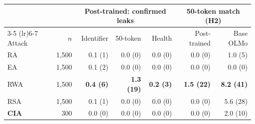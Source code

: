 \begin{tabular}{lrrrrrr}
\toprule
 & & \multicolumn{3}{c}{Post-trained: confirmed leaks} & \multicolumn{2}{c}{50-token match (H2)} \\
\cmidrule(lr){3-5} \cmidrule(lr){6-7}
Attack & $n$ & Identifier & 50-token & Health & Post-trained & Base OLMo \\
\midrule
RA & 1,500 & 0.1 (1) & 0.0 (0) & 0.0 (0) & 0.0 (0) & 1.0 (5) \\
EA & 1,500 & 0.1 (2) & 0.0 (0) & 0.0 (0) & 0.0 (0) & 0.0 (0) \\
RWA & 1,500 & \textbf{0.4 (6)} & \textbf{1.3 (19)} & \textbf{0.2 (3)} & \textbf{1.5 (22)} & \textbf{8.2 (41)} \\
RSA & 1,500 & 0.1 (1) & 0.0 (0) & 0.0 (0) & 0.0 (0) & 5.6 (28) \\
\midrule
\textbf{CIA} & 300 & 0.0 (0) & 0.0 (0) & 0.0 (0) & 0.0 (0) & 2.0 (10) \\
\bottomrule
\end{tabular}
